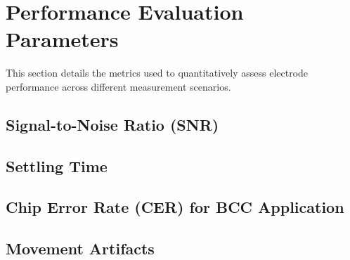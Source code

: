 \documentclass[conference]{IEEEtran}
\begin{document}
\section{Performance Evaluation Parameters}
    This section details the metrics used to quantitatively assess electrode performance across different measurement scenarios.
    
    \subsection{Signal-to-Noise Ratio (SNR)}
        
    \subsection{Settling Time}
        
    \subsection{Chip Error Rate (CER) for BCC Application}
        
    \subsection{Movement Artifacts}

\end{document}
